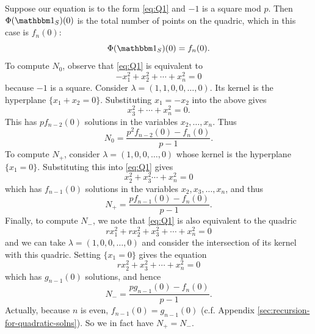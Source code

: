 \begin{example}
	Suppose our equation is to the form \eqref{eq:Q1} and $-1$ is a square mod $p$. Then $\Phi(\IND_S)(0)$ is the total number of points on the quadric, which in this case is $f_n (0)$:
	\[
		\Phi(\IND_S)(0) = f_n(0).
	\]
	To compute $N_0$, observe that \eqref{eq:Q1} is equivalent to
	\[
		-x_1^2 + x_2^2 + \cdots + x_n^2 = 0
	\]
	because $-1$ is a square. Consider $\lambda = (1,1,0,0,\ldots,0)$. Its kernel is the hyperplane $\{x_1 + x_2 = 0\}$. Substituting $x_1 = -x_2$ into the above gives
	\[
	x_3^2 + \cdots + x_n^2 = 0.
	\]
	This has $p f_{n-2}(0)$ solutions in the variables $x_2,\ldots,x_n$. Thus
	\[
	N_0 = \frac{p^2 f_{n-2}(0) - f_n(0)}{p-1}.
	\]
	To compute $N_+$, consider $\lambda = (1,0,0,\ldots,0)$ whose kernel is the hyperplane $\{x_1 = 0\}$. Substituting this into \eqref{eq:Q1} gives
	\[
	x_2^2 + x_3^2 \cdots + x_n^2 = 0
	\]
	which has $f_{n-1}(0)$ solutions in the variables $x_2,x_3,\ldots,x_n$, and thus
	\[
	N_+ = \frac{p f_{n-1}(0) - f_n(0)}{p-1}.
	\]
	Finally, to compute $N_-$, we note that \eqref{eq:Q1} is also equivalent to the quadric
	\[
		rx_1^2 + rx_2^2 + x_3^2 + \cdots + x_n^2 = 0
	\]
	and we can take $\lambda = (1,0,0,\ldots,0)$ and consider the intersection of its kernel with this quadric. Setting $\{x_1 = 0\}$ gives the equation
	\[
		rx_2^2 + x_3^2 + \cdots + x_n^2 = 0
	\]
	which has $g_{n-1}(0)$ solutions, and hence
	\[
		N_- = \frac{pg_{n-1}(0) - f_n(0)}{p-1}.
	\]
	Actually, because $n$ is even, $f_{n-1}(0) = g_{n-1}(0)$ (c.f. Appendix \ref{sec:recursion-for-quadratic-solns}). So we in fact have $N_+ = N_-$.
\end{example}